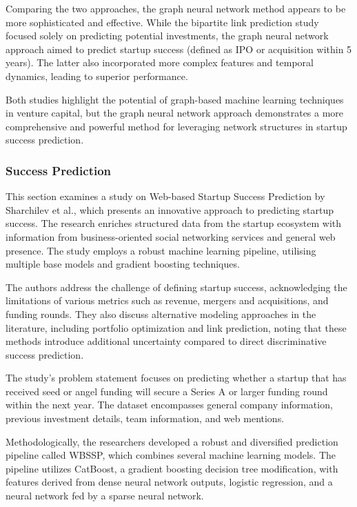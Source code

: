 \documentclass[a4paper, oneside]{discothesis}
\begin{document}
Comparing the two approaches, the graph neural network method appears to be more sophisticated and effective. While the bipartite link prediction study focused solely on predicting potential investments, the graph neural network approach aimed to predict startup success (defined as IPO or acquisition within 5 years). The latter also incorporated more complex features and temporal dynamics, leading to superior performance.

Both studies highlight the potential of graph-based machine learning techniques in venture capital, but the graph neural network approach demonstrates a more comprehensive and powerful method for leveraging network structures in startup success prediction.

\subsubsection{Success Prediction}

This section examines a study on Web-based Startup Success Prediction by Sharchilev et al., which presents an innovative approach to predicting startup success. The research enriches structured data from the startup ecosystem with information from business-oriented social networking services and general web presence. The study employs a robust machine learning pipeline, utilising multiple base models and gradient boosting techniques.

The authors address the challenge of defining startup success, acknowledging the limitations of various metrics such as revenue, mergers and acquisitions, and funding rounds. They also discuss alternative modeling approaches in the literature, including portfolio optimization and link prediction, noting that these methods introduce additional uncertainty compared to direct discriminative success prediction.

The study's problem statement focuses on predicting whether a startup that has received seed or angel funding will secure a Series A or larger funding round within the next year. The dataset encompasses general company information, previous investment details, team information, and web mentions.

Methodologically, the researchers developed a robust and diversified prediction pipeline called WBSSP, which combines several machine learning models. The pipeline utilizes CatBoost, a gradient boosting decision tree modification, with features derived from dense neural network outputs, logistic regression, and a neural network fed by a sparse neural network.
\end{document}
